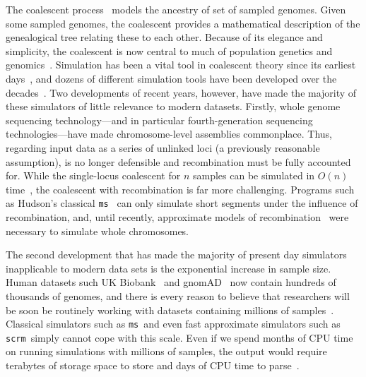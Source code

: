 \documentclass{article}
\newcommand{\ms}[0]{\texttt{ms}}
\newcommand{\scrm}[0]{\texttt{scrm}}
\begin{document}
The coalescent
process~\citep{kingman1982coalescent,hudson1983testing,tajima1983evolutionary}
models the ancestry of set of sampled genomes. Given some sampled
genomes, the coalescent provides a mathematical description of the
genealogical tree relating these to each other. Because of its
elegance and simplicity, the coalescent is now central to much of
population genetics and
genomics~\citep{hudson1990gene,hein2004gene,wakely2008coalescent}.
Simulation has been a vital
tool in coalescent theory since its earliest days~\citep{hudson1983testing},
and dozens of different simulation tools have been
developed over the decades~\citep{carvajal2008simulation,liu2008survey,
arenas2012simulation,yuan2012overview,hoban2012computer}.
Two developments of recent years, however, have made the majority
of these simulators of little relevance to modern datasets.
Firstly, whole genome sequencing technology---and in particular fourth-generation
sequencing technologies---have made chromosome-level assemblies
commonplace. Thus, regarding input data as a series of unlinked loci
(a previously reasonable assumption), is no longer defensible and
recombination must be fully accounted for. While the
single-locus coalescent for $n$ samples can be simulated in $O(n)$
time~\citep{hudson1990gene}, the coalescent with recombination is
far more challenging.
Programs such as Hudson's classical \ms~\citep{hudson2002generating}
can only simulate short segments under the influence of recombination,
and, until recently, approximate models of
recombination~\citep{mcvean2005approximating,staab2015scrm}
were necessary to simulate whole chromosomes.

The second development that has made the majority of
present day simulators inapplicable to modern data sets is the
exponential increase in sample size. Human datasets such
UK Biobank~\citep{bycroft2018genome} and
gnomAD~\citep{karczewski2019variation} now contain hundreds of
thousands of genomes, and there is every reason to believe that
researchers will be soon be routinely working with
datasets containing millions of samples~\citep{stephens2015big}.
Classical simulators such as \ms\ and even fast approximate simulators
such as \scrm\ simply cannot cope with this scale. Even if we
spend months of CPU time on running simulations with millions of samples,
the output would require terabytes of storage space to store and
days of CPU time to parse~\citep{kelleher2016efficient}.
\end{document}
